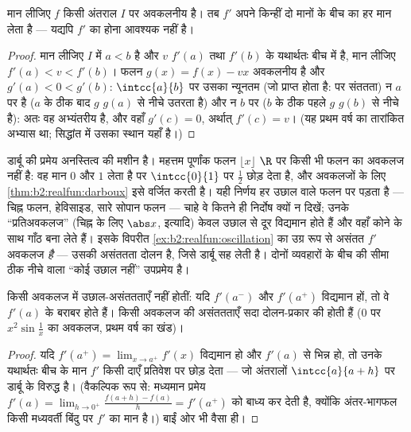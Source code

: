 \begin{theorem}[डार्बू]\label{thm:b2:realfun:darboux}
मान लीजिए $f$ किसी अंतराल $I$ पर अवकलनीय है। तब $f'$ अपने किन्हीं दो
मानों के बीच का हर मान लेता है --- यद्यपि $f'$ का  होना आवश्यक नहीं
है।
\end{theorem}

\begin{proof}
मान लीजिए $I$ में $a < b$ है और $v$ $f'(a)$ तथा $f'(b)$ के यथार्थतः बीच में है, मान
लीजिए $f'(a) < v < f'(b)$। फलन $g(x) = f(x) - vx$ अवकलनीय है और $g'(a) < 0 < g'(b)$: $\intcc{a}{b}$ पर उसका न्यूनतम (जो प्राप्त
होता है:  पर संततता) न $a$ पर है ($a$ के ठीक बाद $g$ $g(a)$ से नीचे
उतरता है) और न $b$ पर ($b$ के ठीक पहले $g$ $g(b)$ से नीचे है): अतः वह
अभ्यंतरीय है, और वहाँ $g'(c)
= 0$, अर्थात् $f'(c) = v$। (यह प्रथम वर्ष का तारांकित
अभ्यास था; सिद्धांत में उसका स्थान यहाँ है।)
\end{proof}

\begin{example}\label{ex:b2:realfun:whichderivatives}
डार्बू की प्रमेय अनस्तित्व की मशीन है। महत्तम पूर्णांक फलन $\lfloor x\rfloor$ $\R$ पर
किसी भी फलन का अवकलज नहीं है: वह मान $0$ और $1$ लेता है पर $\intcc{0}{1}$ पर $\frac12$
छोड़ देता है, और अवकलजों के लिए \cref{thm:b2:realfun:darboux} इसे वर्जित करती है। यही निर्णय हर
उछाल वाले फलन पर पड़ता है --- चिह्न फलन, हेविसाइड, सारे सोपान फलन ---
चाहे वे कितने ही निर्दोष क्यों न दिखें; उनके ``प्रतिअवकलज'' (चिह्न के
लिए $\abs x$, इत्यादि) केवल उछाल से दूर विद्यमान होते हैं और वहाँ कोने के साथ
गाँठ बना लेते हैं। इसके विपरीत \cref{ex:b2:realfun:oscillation} का उग्र रूप से असंतत $f'$ अवकलज
\emph{है} --- उसकी असंततता दोलन है, जिसे डार्बू सह लेती है। दोनों
व्यवहारों के बीच की सीमा ठीक नीचे वाला ``कोई उछाल नहीं'' उपप्रमेय है।
\end{example}

\begin{corollary}\label{cor:b2:realfun:nojumps}
किसी अवकलज में उछाल-असंततताएँ नहीं होतीं: यदि $f'(a^-)$ और $f'(a^+)$ विद्यमान हों,
तो वे $f'(a)$ के बराबर होते हैं। किसी अवकलज की असंततताएँ सदा दोलन-प्रकार की
होती हैं ($0$ पर $x^2\sin\frac1x$ का अवकलज, प्रथम वर्ष का खंड)।
\end{corollary}

\begin{proof}
यदि $f'(a^+) = \lim_{x\to a^+} f'(x)$ विद्यमान हो और $f'(a)$ से भिन्न हो, तो उनके यथार्थतः बीच के मान $f'$
किसी दाएँ प्रतिवेश पर छोड़ देता --- जो अंतरालों $\intcc{a}{a + h}$ पर डार्बू के विरुद्ध
है। (वैकल्पिक रूप से: मध्यमान प्रमेय $f'(a) = \lim_{h\to0^+} \frac{f(a+h)-f(a)}{h} = f'(a^+)$ को बाध्य कर देती है, क्योंकि
अंतर-भागफल किसी मध्यवर्ती बिंदु पर $f'$ का मान है।) बाईं ओर भी वैसा ही।
\end{proof}

